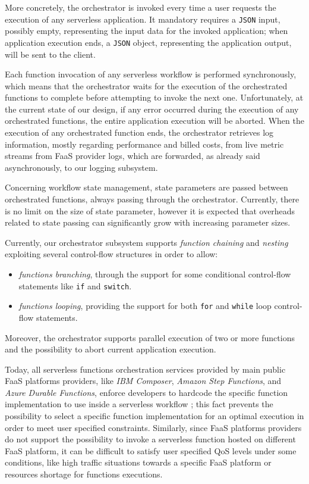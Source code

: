 \documentclass[12pt,a4paper]{report}
\begin{document}
More concretely, the orchestrator is invoked every time a user requests the execution of any serverless application. It mandatory requires a \texttt{JSON} input, possibly empty, representing the input data for the invoked application; when application execution ends, a \texttt{JSON} object, representing the application output, will be sent to the client.

Each function invocation of any serverless workflow is performed synchronously, which means that the orchestrator waits for the execution of the orchestrated functions to complete before attempting to invoke the next one. Unfortunately, at the current state of our design, if any error occurred during the execution of any orchestrated functions, the entire application execution will be aborted. When the execution of any orchestrated function ends, the orchestrator retrieves log information, mostly regarding performance and billed costs, from live metric streams from FaaS provider logs, which are forwarded, as already said asynchronously, to our logging subsystem. 

Concerning workflow state management, state parameters are passed between orchestrated functions, always passing through the orchestrator. Currently, there is no limit on the size of state parameter, however it is expected that overheads related to state passing can significantly grow with increasing parameter sizes.

Currently, our orchestrator subsystem supports \textit{function chaining} and \textit{nesting} exploiting several control-flow structures in order to allow:

\begin{itemize}
	\item \textit{functions branching}, through the support for some conditional control-flow statements like \texttt{if} and \texttt{switch}.

	\item \textit{functions looping}, providing the support for both \texttt{for} and \texttt{while} loop control-flow statements.
\end{itemize}

Moreover, the orchestrator supports parallel execution of two or more functions and the possibility to abort current application execution.
	
Today, all serverless functions orchestration services provided by main public FaaS platforms providers, like \textit{IBM Composer}\cite{IBMComposer}, \textit{Amazon Step Functions}\cite{StepFunctions}, and \textit{Azure Durable Functions}\cite{DurableFunctions}, enforce developers to hardcode the specific function implementation to use inside a serverless workflow \cite{AFCL}; this fact prevents the possibility to select a specific function implementation for an optimal execution in order to meet user specified constraints. Similarly, since FaaS platforms providers do not support the possibility to invoke a serverless function hosted on different FaaS platform, it can be difficult to satisfy user specified QoS levels under some conditions, like high traffic situations towards a specific FaaS platform or resources shortage for functions executions.
\end{document}
